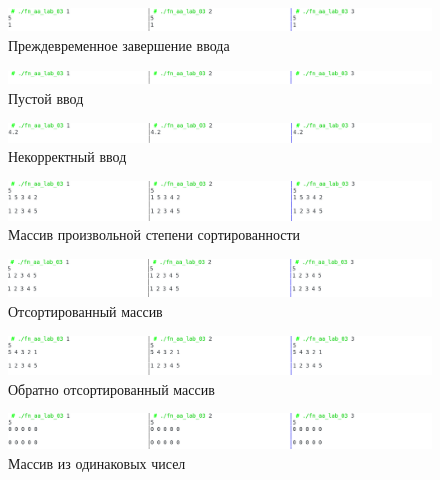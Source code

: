 \begin{figure}[H]
    \centering
    \includegraphics[scale=0.5]{./images/example01.png}
    \caption{Преждевременное завершение ввода}
    \label{img:notfullinput}
\end{figure}
\begin{figure}[H]
    \centering
    \includegraphics[scale=0.5]{./images/example02.png}
    \caption{Пустой ввод}
    \label{img:emptyinput}
\end{figure}
\begin{figure}[H]
    \centering
    \includegraphics[scale=0.5]{./images/example03.png}
    \caption{Некорректный ввод}
    \label{img:wronginput}
\end{figure}
\begin{figure}[H]
    \centering
    \includegraphics[scale=0.5]{./images/example04.png}
    \caption{Массив произвольной степени сортированности}
    \label{img:notsorted}
\end{figure}
\begin{figure}[H]
    \centering
    \includegraphics[scale=0.5]{./images/example05.png}
    \caption{Отсортированный массив}
    \label{img:sorted}
\end{figure}
\begin{figure}[H]
    \centering
    \includegraphics[scale=0.5]{./images/example06.png}
    \caption{Обратно отсортированный массив}
    \label{img:reversed}
\end{figure}
\begin{figure}[H]
    \centering
    \includegraphics[scale=0.5]{./images/example07.png}
    \caption{Массив из одинаковых чисел}
    \label{img:similar}
\end{figure}



